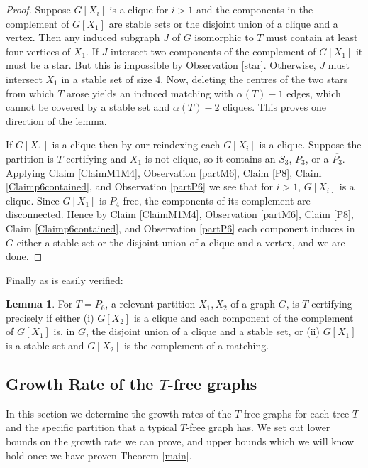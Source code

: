 \documentclass[12pt]{article}
\theoremstyle{definition}
\newtheorem{lemma}[theorem]{Lemma}
\begin{document}
\begin{proof}
Suppose $G[X_i]$ is a clique for $i>1$ and the components in the complement of   $G[X_1]$ are stable sets  or the disjoint 
union of a clique and a vertex.  Then any induced subgraph $J$  of $G$
isomorphic to $T$ must contain  at least four vertices of $X_1$. If $J$ intersect two components 
of the complement of $G[X_1]$ it  must be a star. But this is impossible by Observation \ref{star}. Otherwise,
$J$ must intersect $X_1$ in  a stable set of size 4. Now,  
deleting the centres of the two stars from which $T$ arose 
 yields an induced matching with $\alpha(T)-1$ edges, which cannot be covered by a stable set and $\alpha(T)-2$
 cliques. This proves one direction of the lemma. 

If $G[X_1]$ is a clique then by our reindexing each $G[X_i]$ is a clique. 
Suppose the partition is $T$-certifying and $X_1$ is not  clique, so it  contains  an $S_3$, $P_3$, or  a  $\overline{P_3}$. 
Applying Claim \ref{ClaimM1M4}, Observation \ref{partM6}, Claim \ref{P8},   Claim \ref{Claimp6contained}, and Observation \ref{partP6} we see that for $i>1$, $G[X_i]$ is a clique. 
Since $G[X_1]$ is $P_4$-free, the components of its complement are disconnected. Hence by Claim \ref{ClaimM1M4}, Observation \ref{partM6}, Claim \ref{P8},  Claim \ref{Claimp6contained}, and Observation \ref{partP6} each component induces in $G$  either a stable set or the disjoint union
of a clique and a vertex, and we are done.
\end{proof}

Finally as is easily verified: 

\begin{lemma}\label{p6lem}
 For $T=P_6$, a relevant partition $X_1,X_2$  of a graph $G$, is $T$-certifying 
precisely if  either (i)  $G[X_2]$ is a clique and each component of  the complement of $G[X_1]$ is, in $G$,  the disjoint union of a clique and 
a stable set, or (ii) $G[X_1]$ is a stable set and $G[X_2]$ is  the complement of a matching. 
\end{lemma}

\subsection{Growth Rate of the $T$-free graphs}

In this section we determine the growth rates of the $T$-free graphs for each tree $T$ 
and the specific partition that a typical $T$-free graph has.  We set out lower bounds  on the growth rate we can prove, and upper bounds which we  will know hold once we have proven Theorem \ref{main}. 
\end{document}
